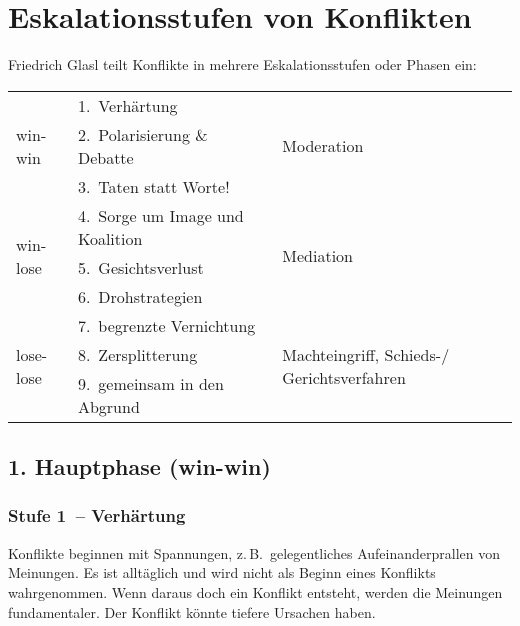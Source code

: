 \section{Eskalationsstufen von Konflikten}
\label{eskalationsstufen}

Friedrich Glasl \cite{glasl-konfliktmanegement} teilt Konflikte in mehrere Eskalationsstufen oder Phasen ein:

\vspace{1em}

\begin{tabular}{ l l l }
  \multirow{3}{5em}{win-win}   & 1.~Verhärtung                   & \multirow{3}{5em}{Moderation} \\
                               & 2.~Polarisierung \& Debatte \\
                               & 3.~Taten statt Worte! \\ \hline
  \multirow{3}{5em}{win-lose}  & 4.~Sorge um Image und Koalition & \multirow{3}{5em}{Mediation} \\
                               & 5.~Gesichtsverlust & \\
                               & 6.~Drohstrategien & \\ \hline
  \multirow{3}{5em}{lose-lose} & 7.~begrenzte Vernichtung        & \multirow{3}{5em}{Machteingriff, Schieds-/ Gerichtsverfahren} \\
                               & 8.~Zersplitterung & \\
                               & 9.~gemeinsam in den Abgrund & \\
\end{tabular}


\subsection{1. Hauptphase (win-win)}

\subsubsection{Stufe 1~-- Verhärtung}

Konflikte beginnen mit Spannungen, z.\,B.~gelegentliches Aufeinanderprallen von Meinungen. Es ist alltäglich und wird nicht als Beginn eines Konflikts wahrgenommen. Wenn daraus doch ein Konflikt entsteht, werden die Meinungen fundamentaler. Der Konflikt könnte tiefere Ursachen haben.


